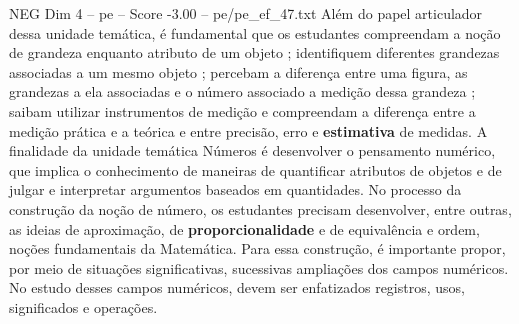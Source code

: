 \begin{textsample}{NEG Dim 4 – pe – Score -3.00 – pe/pe\_ef\_47.txt}
Além do papel articulador dessa unidade temática, é fundamental que os estudantes compreendam a noção de grandeza enquanto atributo de um objeto ; identifiquem diferentes grandezas associadas a um mesmo objeto ; percebam a diferença entre uma figura, as grandezas a ela associadas e o número associado a medição dessa grandeza ; saibam utilizar instrumentos de medição e compreendam a diferença entre a medição prática e a teórica e entre precisão, erro e \textbf{estimativa} de medidas.
A finalidade da unidade temática Números é desenvolver o pensamento numérico, que implica o conhecimento de maneiras de quantificar atributos de objetos e de julgar e interpretar argumentos baseados em quantidades.
No processo da construção da noção de número, os estudantes precisam desenvolver, entre outras, as ideias de aproximação, de \textbf{proporcionalidade} e de equivalência e ordem, noções fundamentais da Matemática.
Para essa construção, é importante propor, por meio de situações significativas, sucessivas ampliações dos campos numéricos.
No estudo desses campos numéricos, devem ser enfatizados registros, usos, significados e operações.

\end{textsample}
